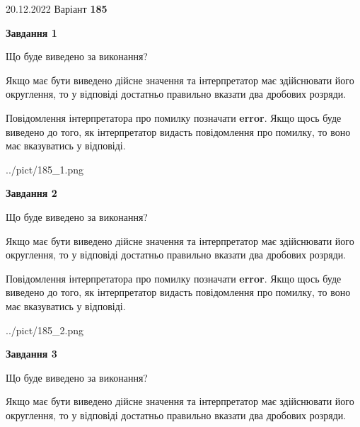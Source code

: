 \documentclass[12pt, ukrainian]{article}
\begin{document}
{20.12.2022 Варіант \No \textbf { 185 }\par}
{
\begin {Large}

{\begin {center}\textbf{Завдання 1}\end {center}}\par
Що буде виведено за виконання? \par

Якщо має бути виведено дійсне значення та інтерпретатор має здійснювати його округлення, 
то у відповіді достатньо правильно вказати два дробових розряди.

Повідомлення інтерпретатора про помилку позначати \textbf{error}.
Якщо щось буде виведено до того, як інтерпретатор видасть повідомлення про помилку, 
то воно має вказуватись у відповіді. \par

\begin{center}
	{../pict/185_1.png}
\end{center}
\newpage

{\begin {center}\textbf{Завдання 2}\end {center}}\par
Що буде виведено за виконання? \par

Якщо має бути виведено дійсне значення та інтерпретатор має здійснювати його округлення, 
то у відповіді достатньо правильно вказати два дробових розряди.

Повідомлення інтерпретатора про помилку позначати \textbf{error}.
Якщо щось буде виведено до того, як інтерпретатор видасть повідомлення про помилку, 
то воно має вказуватись у відповіді. \par

\begin{center}
	{../pict/185_2.png}
\end{center}
\newpage

{\begin {center}\textbf{Завдання 3}\end {center}}\par
Що буде виведено за виконання? \par

Якщо має бути виведено дійсне значення та інтерпретатор має здійснювати його округлення, 
то у відповіді достатньо правильно вказати два дробових розряди.


\end{Large}}
\end{document}
